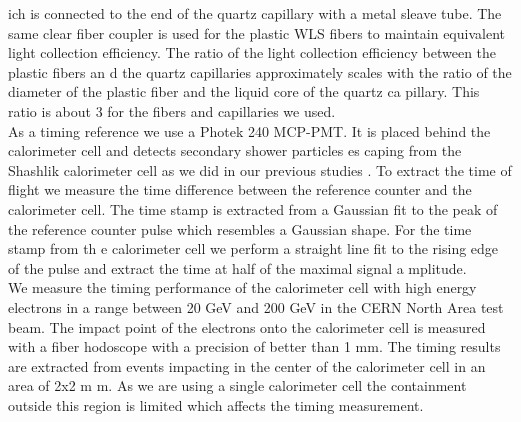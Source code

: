 ich is connected to the end of the quartz capillary with a metal sleave tube. The same clear fiber coupler is used for the plastic WLS
 fibers to maintain equivalent light collection efficiency. The ratio of the light collection efficiency between the plastic fibers an
d the quartz capillaries approximately scales with the ratio of the diameter of the plastic fiber and the liquid core of the quartz ca
pillary. This ratio is about 3 for the fibers and capillaries we used.\\  
As a timing reference we  use a Photek 240 MCP-PMT. It is placed behind the calorimeter cell and detects secondary shower particles es
caping from the Shashlik calorimeter cell as we did in our previous studies \cite{lysotiming}.
To extract the time of flight we measure the time difference between the reference counter and the calorimeter cell. The time stamp is
 extracted from a Gaussian fit to the peak of the reference counter pulse which resembles a Gaussian shape. For the time stamp from th
e calorimeter cell we perform a straight line fit to the rising edge of the pulse and extract the time at half of the maximal signal a
mplitude.\\
We measure the timing performance of the calorimeter cell with high energy electrons in a range between 20 GeV and 200 GeV in the CERN
 North Area test beam. The impact point of the electrons onto the calorimeter cell is measured with a fiber hodoscope with a precision
 of better than 1 mm. The timing results are extracted from events impacting in the center of the calorimeter cell in an area of 2x2 m
m. As we are using a single calorimeter cell the containment outside this region is limited which affects the timing measurement.\\



